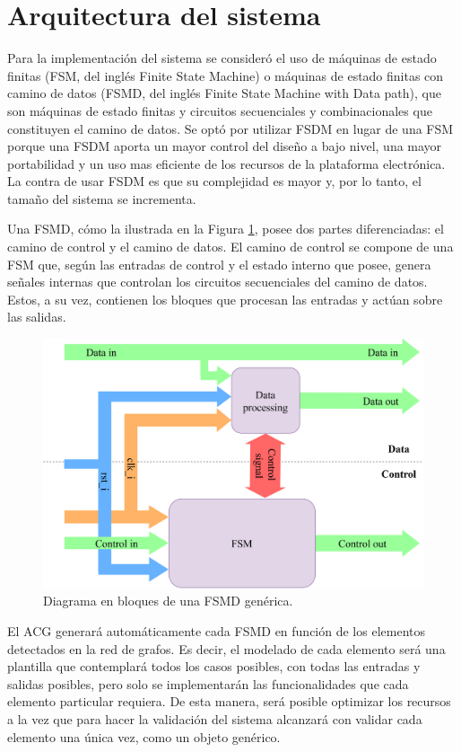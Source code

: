 \section{Arquitectura del sistema}
	\label{sec:interlockingArch}
	
	Para la implementación del sistema se consideró el uso de máquinas de estado finitas (FSM, del inglés Finite State Machine) o máquinas de estado finitas con camino de datos (FSMD, del inglés Finite State Machine with Data path), que son máquinas de estado finitas y circuitos
	secuenciales y combinacionales que constituyen el camino de datos. Se optó por utilizar FSDM en lugar de una FSM porque una FSDM aporta un mayor control del diseño a bajo nivel, una mayor portabilidad y un uso mas eficiente de los recursos de la plataforma electrónica. La contra de usar FSDM es que su complejidad es mayor y, por lo tanto, el tamaño del sistema se incrementa.
	
	Una FSMD, cómo la ilustrada en la Figura \ref{fig:FSMD}, posee dos partes diferenciadas: el camino de control y el camino de datos. El camino de control se compone de una FSM que, según las entradas de control y el estado interno que posee, genera señales internas que controlan los circuitos secuenciales del camino de datos. Estos, a su vez, contienen los bloques que procesan las entradas y actúan sobre las salidas.
	
	\begin{figure}[H]
		\centering
		\includegraphics[width=1\textwidth]{Figuras/FSMD.png}
		\centering\caption{Diagrama en bloques  de una FSMD genérica.}
		\label{fig:FSMD}
	\end{figure}
	
	El ACG generará automáticamente cada FSMD en función de los elementos detectados en la red de grafos. Es decir, el modelado de cada elemento será una plantilla que contemplará todos los casos posibles, con todas las entradas y salidas posibles, pero solo se implementarán las funcionalidades que cada elemento particular requiera. De esta manera, será posible optimizar los recursos a la vez que para hacer la validación del sistema alcanzará con validar cada elemento una única vez, como un objeto genérico.
	
